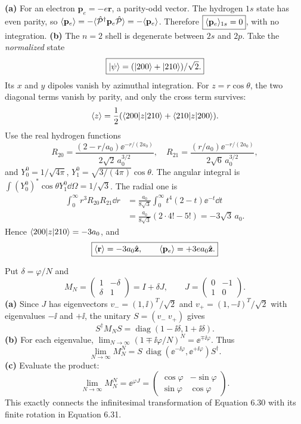 \textbf{(a)} For an electron
$\mathbf p_e=-e\mathbf r$,
a parity-odd vector.
The hydrogen $1s$ state has even parity,
so $\langle \mathbf p_e\rangle=-
\langle \hat{\mathcal P}^\dagger\mathbf p_e\hat{\mathcal P}\rangle
=-\langle \mathbf p_e\rangle$.
Therefore
$\boxed{\langle \mathbf p_e\rangle_{1s}=0}$,
with no integration.
\textbf{(b)} The $n=2$ shell is
degenerate between $2s$ and $2p$.
Take the \emph{normalized} state
\begin{equation}
\boxed{\lvert \psi\rangle=
(\lvert 200\rangle+\lvert 210\rangle)/\sqrt2.}
\end{equation}
Its $x$ and $y$ dipoles vanish by
azimuthal integration. For $z=r\cos\theta$,
the two diagonal terms vanish by parity,
and only the cross term survives:
\[
\langle z\rangle=\frac12
(\langle 200\rvert z\lvert 210\rangle
+\langle 210\rvert z\lvert 200\rangle).
\]
Use the real hydrogen functions
\[
R_{20}=\frac{(2-r/a_0)\ee^{-r/(2a_0)}}{
2\sqrt2\,a_0^{3/2}},\quad
R_{21}=\frac{(r/a_0)\ee^{-r/(2a_0)}}{
2\sqrt6\,a_0^{3/2}},
\]
and $Y_0^0=1/\sqrt{4\pi}$,
$Y_1^0=\sqrt{3/(4\pi)}\cos\theta$.
The angular integral is
$\int (Y_0^0)^*\cos\theta Y_1^0\dd\Omega
=1/\sqrt3$. The radial one is
\begin{align}
\int_0^\infty r^3R_{20}R_{21}\dd r
&=\frac{a_0}{8\sqrt3}
\int_0^\infty t^4(2-t)\ee^{-t}\dd t\\
&=\frac{a_0}{8\sqrt3}(2\cdot4!-5!)
=-3\sqrt3\,a_0.
\end{align}
Hence $\langle 200\rvert z\lvert 210\rangle=-3a_0$,
and
\begin{equation}
\boxed{\langle \mathbf r\rangle=-3a_0\hat{\mathbf z},
\qquad\langle \mathbf p_e\rangle=+3ea_0\hat{\mathbf z}.}
\end{equation}

Put $\delta=\varphi/N$ and
\[
M_N=\begin{pmatrix}1&-\delta\\\delta&1\end{pmatrix}
=I+\delta J,\qquad
J=\begin{pmatrix}0&-1\\1&0\end{pmatrix}.
\]
\textbf{(a)} Since $J$ has eigenvectors
$v_-=(1,\ii)^T/\sqrt2$ and
$v_+=(1,-\ii)^T/\sqrt2$
with eigenvalues $-\ii$ and $+\ii$,
the unitary $S=(v_-\ v_+)$ gives
\[
\boxed{S^\dagger M_NS=
\operatorname{diag}(1-\ii\delta,1+\ii\delta).}
\]
\textbf{(b)} For each eigenvalue,
$\lim_{N\to\infty}
(1\mp\ii\varphi/N)^N=\ee^{\mp\ii\varphi}$.
Thus
\[
\lim_{N\to\infty}M_N^N=
S\,\operatorname{diag}(\ee^{-\ii\varphi},
\ee^{+\ii\varphi})S^\dagger.
\]
\textbf{(c)} Evaluate the product:
\begin{equation}
\boxed{\lim_{N\to\infty}M_N^N=
\ee^{\varphi J}=
\begin{pmatrix}
\cos\varphi&-\sin\varphi\\
\sin\varphi&\cos\varphi
\end{pmatrix}.}
\end{equation}
This exactly connects the
infinitesimal transformation
of Equation 6.30 with its finite
rotation in Equation 6.31.

